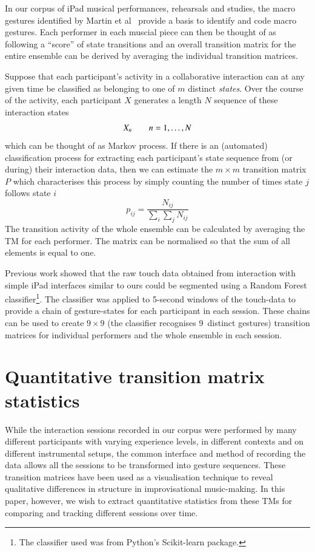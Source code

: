 \documentclass{sigchi}
\begin{document}
In our corpus of iPad musical performances, rehearsals and studies,
the macro gestures identified by Martin et al~\cite{Martin:2014cr}
provide a basis to identify and code macro gestures. Each performer in
each muscial piece can then be thought of as following a ``score'' of
state transitions and an overall transition matrix for the entire
ensemble can be derived by averaging the individual transition
matrices.

Suppose that each participant's activity in a collaborative
interaction can at any given time be classified as belonging to one of
$m$ distinct \emph{states}. Over the course of the activity, each
participant $X$ generates a length $N$ sequence of these interaction
states
\begin{equation}
 X_n \hskip 2em n = 1, \ldots, N
\end{equation}
which can be thought of as Markov process. If there is an
(automated) classification process for extracting each participant's
state sequence from (or during) their interaction data, then we can
estimate the $m \times m$ transition matrix $P$ which characterises
this process by simply counting the number of times state $j$ follows
state $i$
\begin{equation}
  p_{ij} = \frac{N_{ij}}{\sum_i \sum_j N_{ij}}
\end{equation}
The transition activity of the whole ensemble can be calculated by
averaging the TM for each performer. The matrix can be normalised so
that the sum of all elements is equal to one.

Previous work showed that the raw touch data obtained from interaction
with simple iPad interfaces similar to ours could be segmented using a
Random Forest\cite{Breiman:2001kx} classifier\footnote{The classifier
  used was from Python's Scikit-learn package\cite{scikit-learn}.}.
The classifier was applied to 5-second windows of the touch-data to
provide a chain of gesture-states for each participant in each
session. These chains can be used to create $9 \times 9$ (the
classifier recognises 9~distinct gestures) transition matrices for
individual performers and the whole ensemble in each session.

\section{Quantitative transition matrix statistics}
\label{sec:underst-impr-group}

While the interaction sessions recorded in our corpus were performed
by many different participants with varying experience levels, in
different contexts and on different instrumental setups, the common
interface and method of recording the data allows all the sessions to
be transformed into gesture sequences. These transition matrices have
been used as a visualisation technique to reveal qualitative
differences in structure in improvisational
music-making\cite{Swift:2014tya}. In this paper, however, we wish to
extract quantitative statistics from these TMs for comparing and
tracking different sessions over time.
\end{document}
